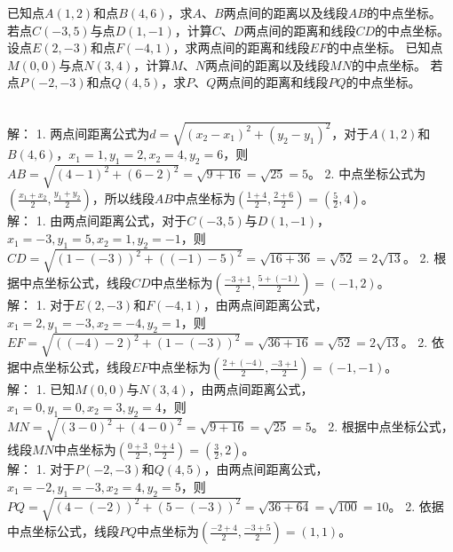 
\begin{Exercise}[title={两点间距离与中点坐标计算练习}, label={ex:distance_midpoint}]
    \Question 已知点\(A(1, 2)\)和点\(B(4, 6)\)，求\(A\)、\(B\)两点间的距离以及线段\(AB\)的中点坐标。
    \Question 若点\(C(-3, 5)\)与点\(D(1, -1)\)，计算\(C\)、\(D\)两点间的距离和线段\(CD\)的中点坐标。
    \Question 设点\(E(2, -3)\)和点\(F(-4, 1)\)，求两点间的距离和线段\(EF\)的中点坐标。
    \Question 已知点\(M(0, 0)\)与点\(N(3, 4)\)，计算\(M\)、\(N\)两点间的距离以及线段\(MN\)的中点坐标。
    \Question 若点\(P(-2, -3)\)和点\(Q(4, 5)\)，求\(P\)、\(Q\)两点间的距离和线段\(PQ\)的中点坐标。
\end{Exercise}
\begin{MyAnswer}[ref={ex:distance_midpoint}]
    \Question 
        \\
        解：
        1. 两点间距离公式为\(d = \sqrt{(x_2 - x_1)^2+(y_2 - y_1)^2}\)，对于\(A(1, 2)\)和\(B(4, 6)\)，\(x_1 = 1,y_1 = 2,x_2 = 4,y_2 = 6\)，则\(AB=\sqrt{(4 - 1)^2+(6 - 2)^2}=\sqrt{9 + 16}=\sqrt{25}=5\)。
        2. 中点坐标公式为\((\frac{x_1 + x_2}{2},\frac{y_1 + y_2}{2})\)，所以线段\(AB\)中点坐标为\((\frac{1 + 4}{2},\frac{2 + 6}{2}) = (\frac{5}{2}, 4)\)。
    \Question 
        \\
        解：
        1. 由两点间距离公式，对于\(C(-3, 5)\)与\(D(1, -1)\)，\(x_1=-3,y_1 = 5,x_2 = 1,y_2=-1\)，则\(CD=\sqrt{(1 - (-3))^2+((-1)-5)^2}=\sqrt{16 + 36}=\sqrt{52}=2\sqrt{13}\)。
        2. 根据中点坐标公式，线段\(CD\)中点坐标为\((\frac{-3 + 1}{2},\frac{5 + (-1)}{2})=(-1, 2)\)。
    \Question 
        \\
        解：
        1. 对于\(E(2, -3)\)和\(F(-4, 1)\)，由两点间距离公式，\(x_1 = 2,y_1=-3,x_2=-4,y_2 = 1\)，则\(EF=\sqrt{((-4)-2)^2+(1 - (-3))^2}=\sqrt{36 + 16}=\sqrt{52}=2\sqrt{13}\)。
        2. 依据中点坐标公式，线段\(EF\)中点坐标为\((\frac{2 + (-4)}{2},\frac{-3 + 1}{2})=(-1, -1)\)。
    \Question 
        \\
        解：
        1. 已知\(M(0, 0)\)与\(N(3, 4)\)，由两点间距离公式，\(x_1 = 0,y_1 = 0,x_2 = 3,y_2 = 4\)，则\(MN=\sqrt{(3 - 0)^2+(4 - 0)^2}=\sqrt{9 + 16}=\sqrt{25}=5\)。
        2. 根据中点坐标公式，线段\(MN\)中点坐标为\((\frac{0 + 3}{2},\frac{0 + 4}{2})=(\frac{3}{2}, 2)\)。
    \Question 
        \\
        解：
        1. 对于\(P(-2, -3)\)和\(Q(4, 5)\)，由两点间距离公式，\(x_1=-2,y_1=-3,x_2 = 4,y_2 = 5\)，则\(PQ=\sqrt{(4 - (-2))^2+(5 - (-3))^2}=\sqrt{36 + 64}=\sqrt{100}=10\)。
        2. 依据中点坐标公式，线段\(PQ\)中点坐标为\((\frac{-2 + 4}{2},\frac{-3 + 5}{2})=(1, 1)\)。
\end{MyAnswer}



